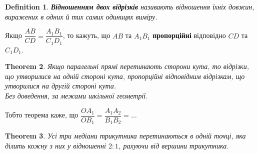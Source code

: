 \documentclass[a4paper, 10pt]{article}
\theoremstyle{theoremdd}
\newtheorem{theorem}{Theorem}[subsection]
\theoremstyle{theoremdd}
\theoremstyle{theoremdd}
\newtheorem{definition}[theorem]{Definition}
\theoremstyle{theoremdd}
\theoremstyle{theoremdd}
\theoremstyle{theoremdd}
\theoremstyle{theoremdd}
\theoremstyle{theoremdd}
\theoremstyle{theoremdd}
\begin{document}
\begin{definition}
\textbf{Відношенням двох відрізків} називають відношення їхніх довжин, виражених в одних й тих самих одиницях виміру.
\end{definition}
Якщо $\dfrac{AB}{CD} = \dfrac{A_1B_1}{C_1D_1}$, то кажуть, що $AB$ та $A_1B_1$ \textbf{пропорційні} відповідно $CD$ та $C_1D_1$.

\begin{theorem}
Якщо паралельні прямі перетинають сторони кута, то відрізки, що утворилися на одній стороні кута, пропорційні відповідним відрізкам, що утворилися на другій стороні кута.\\
\textit{Без доведення, за межами шкільної геометрії.}
\end{theorem}
\begin{figure}[H]
\centering
{}
\end{figure}
Тобто теорема каже, що $\dfrac{OA_1}{OB_1} = \dfrac{A_1A_2}{B_1B_2} = \dots$

\begin{theorem}
Усі три медіани трикутника перетинаються в одній точці, яка ділить кожну з них у відношенні $2 : 1$, рахуючи від вершини трикутника.
\end{theorem}
\end{document}
